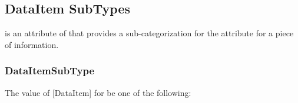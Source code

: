 \subsection{DataItem SubTypes} \label{sec:DataItem SubTypes}


 is an attribute of  that provides a sub-categorization for the  attribute for a piece of information.


\subsubsection{DataItemSubType}
\label{sec:DataItemSubType}






The value of [DataItem] for  \MUST be one of the following:

